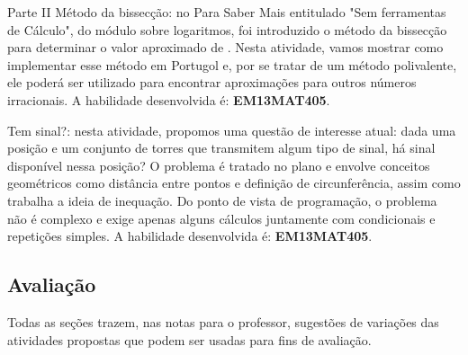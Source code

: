 \begin{paginatexto}{Parte II}
Método da bissecção: no Para Saber Mais entitulado "Sem ferramentas de Cálculo", do módulo sobre logaritmos, foi introduzido o método da bissecção para determinar o valor aproximado de . Nesta atividade, vamos mostrar como implementar esse método em Portugol e, por se tratar de um método polivalente, ele poderá ser utilizado para encontrar aproximações para outros números irracionais. A habilidade desenvolvida é: \textbf{EM13MAT405}.

Tem sinal?: nesta atividade, propomos uma questão de interesse atual: dada uma posição e um conjunto de torres que transmitem algum tipo de sinal, há sinal disponível nessa posição? O problema é tratado no plano e envolve conceitos geométricos como distância entre pontos e definição de circunferência, assim como trabalha a ideia de inequação. Do ponto de vista de programação, o problema não é complexo e exige apenas alguns cálculos juntamente com condicionais e repetições simples. A habilidade desenvolvida é: \textbf{EM13MAT405}.

\subsection{Avaliação}

Todas as seções trazem, nas notas para o professor, sugestões de variações das atividades propostas que podem ser usadas para fins de avaliação.
\end{paginatexto}

